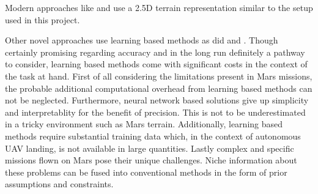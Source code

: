 Modern approaches like \citep{Fankhauser2014RobotCentric, Forster2015Continuous} and \citep{Daftry2018Robust} use a 2.5D terrain representation similar to the setup used in this project.

Other novel approaches use learning based methods as did \citep{Neves2024Multimodal, Abdollahzadeh2022SafeLandingZones} and \citep{TovanchePicon2024RealTimeSafeValidation}. Though certainly promising regarding accuracy and in the long run definitely a pathway to consider, learning based methods come with significant costs in the context of the task at hand. First of all considering the limitations present in Mars missions, the probable additional computational overhead from learning based methods can not be neglected. Furthermore, neural network based solutions give up simplicity and interpretablity for the benefit of precision. This is not to be underestimated in a tricky environment such as Mars terrain. Additionally, learning based methods require substantial training data which, in the context of autonomous UAV landing, is not available in large quantities. Lastly complex and specific missions flown on Mars pose their unique challenges. Niche information about these problems can be fused into conventional methods in the form of prior assumptions and constraints.

% 